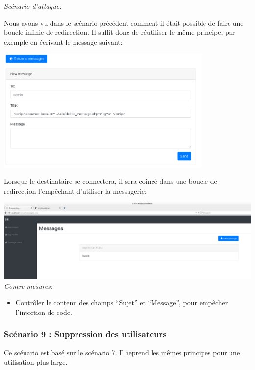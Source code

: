 \documentclass{article}
\begin{document}
\textit{Scénario d'attaque:}

Nous avons vu dans le scénario précédent comment il était possible de
faire une boucle infinie de redirection. Il suffit donc de réutiliser le
même principe, par exemple en écrivant le message suivant:\\

\begin{center}\includegraphics[width=0.8\textwidth]{images/loop1.PNG}\end{center}

Lorsque le destinataire se connectera, il sera coincé dans une boucle de
redirection l'empêchant d'utiliser la messagerie:

\includegraphics[width=\textwidth]{images/loop2.PNG}\\

\textit{Contre-mesures:}

\begin{itemize}

\item
  Contrôler le contenu des champs ``Sujet'' et ``Message'', pour
  empêcher l'injection de code.
\end{itemize}

\subsubsection{Scénario 9 : Suppression des utilisateurs}

Ce scénario est basé sur le scénario 7. Il reprend les mêmes principes
pour une utilisation plus large.\\
\end{document}
